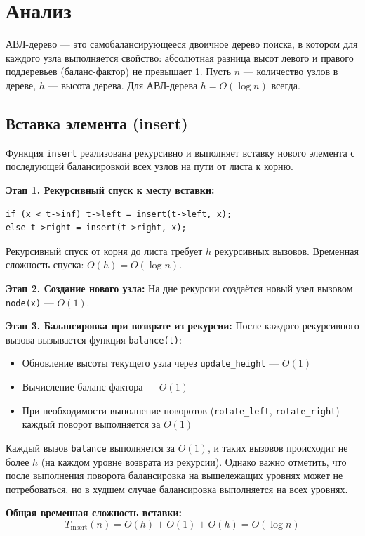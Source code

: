 \documentclass[otchet]{SCWorks}
\begin{document}
\newpage

\section{Анализ}

АВЛ-дерево --- это самобалансирующееся двоичное дерево поиска, в котором для каждого узла выполняется свойство: абсолютная разница высот левого и правого поддеревьев (баланс-фактор) не превышает 1.
Пусть \(n\) --- количество узлов в дереве, \(h\) — высота дерева. Для АВЛ-дерева \(h = O(\log n)\) всегда.

\subsection*{Вставка элемента (insert)}

Функция \texttt{insert} реализована рекурсивно и выполняет вставку нового элемента с последующей балансировкой всех узлов на пути от листа к корню.

\textbf{Этап 1. Рекурсивный спуск к месту вставки:}
\begin{verbatim}
if (x < t->inf) t->left = insert(t->left, x);
else t->right = insert(t->right, x);
\end{verbatim}
Рекурсивный спуск от корня до листа требует \(h\) рекурсивных вызовов. Временная сложность спуска: \(O(h) = O(\log n)\).

\textbf{Этап 2. Создание нового узла:}
На дне рекурсии создаётся новый узел вызовом \texttt{node(x)} — \(O(1)\).

\textbf{Этап 3. Балансировка при возврате из рекурсии:}
После каждого рекурсивного вызова вызывается функция \texttt{balance(t)}:
\begin{itemize}
    \item Обновление высоты текущего узла через \texttt{update\_height} — \(O(1)\)
    \item Вычисление баланс-фактора — \(O(1)\)
    \item При необходимости выполнение поворотов (\texttt{rotate\_left}, \texttt{rotate\_right}) — каждый поворот выполняется за \(O(1)\)
\end{itemize}
Каждый вызов \texttt{balance} выполняется за \(O(1)\), и таких вызовов происходит не более \(h\) (на каждом уровне возврата из рекурсии). Однако важно отметить, что после выполнения поворота балансировка на вышележащих уровнях может не потребоваться, но в худшем случае балансировка выполняется на всех уровнях.

\textbf{Общая временная сложность вставки:}
\[
T_{\text{insert}}(n) = O(h) + O(1) + O(h) = O(\log n)
\]
\end{document}
